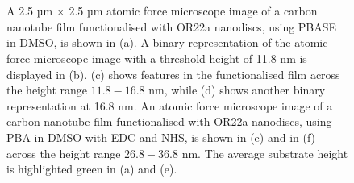 \documentclass[
  a4paper,
]{scrbook}
\begin{document}
\begin{figure}
\begin{minipage}[t]{0.03\linewidth}
\end{minipage}%
%
\begin{minipage}[t]{0.01\linewidth}

{\centering 

~

}

\end{minipage}%
%
\begin{minipage}[t]{0.45\linewidth}

{\centering 


}

\end{minipage}%
%
\begin{minipage}[t]{0.01\linewidth}

{\centering 

~

}

\end{minipage}%

\caption{\label{fig-DMSO-AFM-comparison}A 2.5 µm \(\times\) 2.5 µm
atomic force microscope image of a carbon nanotube film functionalised
with OR22a nanodiscs, using PBASE in DMSO, is shown in (a). A binary
representation of the atomic force microscope image with a threshold
height of 11.8 nm is displayed in (b). (c) shows features in the
functionalised film across the height range \(11.8-16.8\) nm, while (d)
shows another binary representation at 16.8 nm. An atomic force
microscope image of a carbon nanotube film functionalised with OR22a
nanodiscs, using PBA in DMSO with EDC and NHS, is shown in (e) and in
(f) across the height range \(26.8-36.8\) nm. The average substrate
height is highlighted green in (a) and (e).}

\end{figure}
\end{document}
